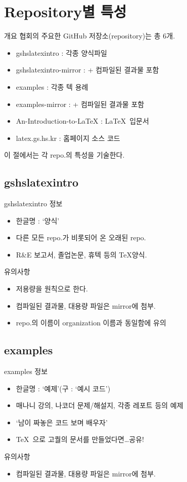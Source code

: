 \documentclass[12pt]{beamer}
\begin{document}
\section{Repository별 특성}
\begin{frame}{개요}
	협회의 주요한 GitHub 저장소(repository)는 총 6개.
	\begin{itemize}
		\item gshslatexintro : 각종 양식파일
		\item gshslatexintro-mirror : + 컴파일된 결과물 포함
		\item examples : 각종 텍 용례
		\item examples-mirror : + 컴파일된 결과물 포함
		\item An-Introduction-to-LaTeX : \LaTeX\ 입문서
		\item latex.gs.hs.kr : 홈페이지 소스 코드
	\end{itemize}
	이 절에서는 각 repo.의 특성을 기술한다.
\end{frame}
\subsection{gshslatexintro}
\begin{frame}{gshslatexintro}
	정보
	\begin{itemize}
		\item 한글명 : `양식'
		\item 다른 모든 repo.가 비롯되어 온 오래된 repo.
		\item R\&E 보고서, 졸업논문, 휴텍 등의 \TeX 양식.
	\end{itemize}
	\vfill
	유의사항
	\begin{itemize}
		\item 저용량을 원칙으로 한다.
		\item 컴파일된 결과물, 대용량 파일은 mirror에 첨부.
		\item repo.의 이름이 organization 이름과 동일함에 유의
	\end{itemize}
	\vfill
\end{frame}
\subsection{examples}
\begin{frame}{examples}
	정보
	\begin{itemize}
		\item 한글명 : `예제'(구 : `예시 코드')
		\item 매나니 강의, 나코더 문제/해설지, 각종 레포트 등의 예제
		\item `남이 짜놓은 코드 보며 배우자'
		\item \TeX\ 으로 고퀄의 문서를 만들었다면\ldots 공유!
	\end{itemize}
	\vfill
	유의사항
	\begin{itemize}
		\item 컴파일된 결과물, 대용량 파일은 mirror에 첨부.
	\end{itemize}
	\vfill
\end{frame}
\end{document}
